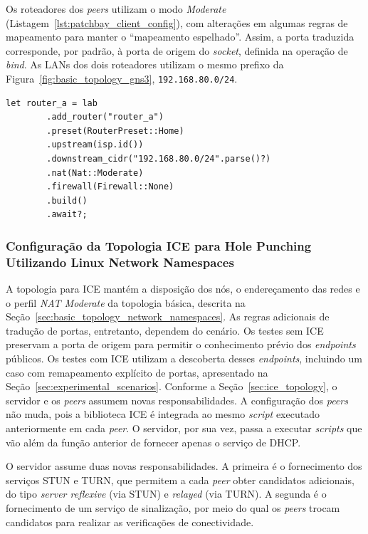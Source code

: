 Os roteadores dos \textit{peers} utilizam o modo \textit{Moderate} (Listagem~\ref{lst:patchbay_client_config}), com alterações em algumas regras de mapeamento para manter o ``mapeamento espelhado''. Assim, a porta traduzida corresponde, por padrão, à porta de origem do \textit{socket}, definida na operação de \textit{bind}. As LANs dos dois roteadores utilizam o mesmo prefixo da Figura~\ref{fig:basic_topology_gns3}, \texttt{192.168.80.0/24}.

\begin{lstlisting}[float=htbp, caption={Configuração de roteadores no \texttt{PatchBay}.}, label={lst:patchbay_client_config}]
    let router_a = lab
        .add_router("router_a")
        .preset(RouterPreset::Home)
        .upstream(isp.id())
        .downstream_cidr("192.168.80.0/24".parse()?)
        .nat(Nat::Moderate)
        .firewall(Firewall::None)
        .build()
        .await?;
\end{lstlisting}

\subsubsection{Configuração da Topologia ICE para Hole Punching Utilizando Linux Network Namespaces}
\label{sec:ice_topology_network_namespaces}

A topologia para ICE mantém a disposição dos nós, o endereçamento das redes e o perfil \textit{NAT Moderate} da topologia básica, descrita na Seção~\ref{sec:basic_topology_network_namespaces}. As regras adicionais de tradução de portas, entretanto, dependem do cenário. Os testes sem ICE preservam a porta de origem para permitir o conhecimento prévio dos \textit{endpoints} públicos. Os testes com ICE utilizam a descoberta desses \textit{endpoints}, incluindo um caso com remapeamento explícito de portas, apresentado na Seção~\ref{sec:experimental_scenarios}. Conforme a Seção~\ref{sec:ice_topology}, o servidor e os \textit{peers} assumem novas responsabilidades. A configuração dos \textit{peers} não muda, pois a biblioteca ICE é integrada ao mesmo \textit{script} executado anteriormente em cada \textit{peer}. O servidor, por sua vez, passa a executar \textit{scripts} que vão além da função anterior de fornecer apenas o serviço de DHCP.

O servidor assume duas novas responsabilidades. A primeira é o fornecimento dos serviços STUN e TURN, que permitem a cada \textit{peer} obter candidatos adicionais, do tipo \textit{server reflexive} (via STUN) e \textit{relayed} (via TURN). A segunda é o fornecimento de um serviço de sinalização, por meio do qual os \textit{peers} trocam candidatos para realizar as verificações de conectividade.

